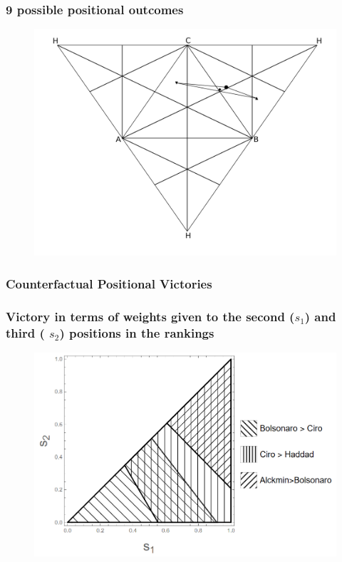 \documentclass[xcolor={svgnames}]{beamer}
\begin{document}
\begin{frame}
  \frametitle{9 possible positional outcomes}
\begin{figure}[!h] \centering \includegraphics[width=\textwidth]{../images/opened_tetrahedron1.png}
 
\end{figure}

\end{frame}

\begin{frame}
  \frametitle{Counterfactual Positional Victories }

\end{frame}

\begin{frame}
  \frametitle{Victory in terms of weights given to the second  (\(s_1\)) and third ( \(s_2\)) positions in the rankings}
\begin{figure}[!h] \centering \includegraphics[width=\columnwidth]{../images/counterfactual_triangle.png}
\end{figure}


\end{frame}
\end{document}

